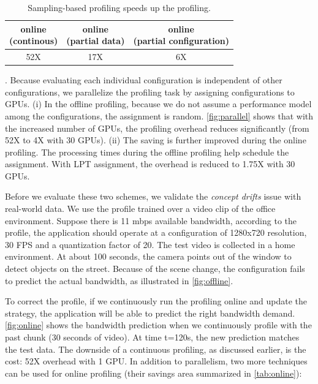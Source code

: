 
\begin{table}[t]
  \centering
  \begin{tabular}{c c c}
    \toprule
    \specialcell{online\\ (continous)} &  \specialcell{online\\ (partial data)} & \specialcell{online\\ (partial configuration)} \\
    \midrule
    52X   & 17X              & 6X \\
    \bottomrule
  \end{tabular}
  \caption{Sampling-based profiling speeds up the profiling.}
  \label{tab:online}
\end{table}

. Because evaluating each
individual configuration is independent of other configurations, we parallelize
the profiling task by assigning configurations to GPUs. (i) In the offline
profiling, because we do not assume a performance model among the
configurations, the assignment is random. \autoref{fig:parallel} shows that with
the increased number of GPUs, the profiling overhead reduces significantly (from
52X to 4X with 30 GPUs). (ii) The saving is further improved during the online
profiling. The processing times during the offline profiling help schedule the
assignment. With LPT assignment, the overhead is reduced to 1.75X with 30 GPUs.

 Before we evaluate these two
schemes, we validate the \textit{concept drifts} issue with real-world data. We
use the profile trained over a video clip of the office environment. Suppose
there is 11 mbps available bandwidth, according to the profile, the application
should operate at a configuration of 1280x720 resolution, 30 FPS and a
quantization factor of 20. The test video is collected in a home environment. At
about 100 seconds, the camera points out of the window to detect objects on the
street.  Because of the scene change, the configuration fails to predict the
actual bandwidth, as illustrated in \autoref{fig:offline}.

To correct the profile, if we continuously run the profiling online and update
the strategy, the application will be able to predict the right bandwidth
demand. \autoref{fig:online} shows the bandwidth prediction when we continuously
profile with the past chunk (30 seconds of video). At time t=120s, the new
prediction matches the test data. The downside of a continuous profiling, as
discussed earlier, is the cost: 52X overhead with 1 GPU. In addition to
parallelism, two more techniques can be used for online profiling (their savings
area summarized in \autoref{tab:online}):

